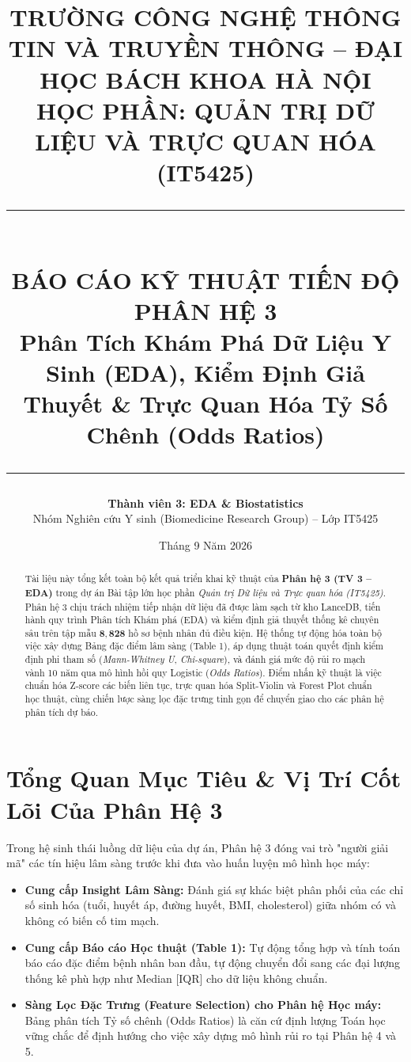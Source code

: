 \documentclass[11pt, a4paper]{article}
\title{%
  \vspace{-1.5cm}
  {\Large\bfseries TRƯỜNG CÔNG NGHỆ THÔNG TIN VÀ TRUYỀN THÔNG -- ĐẠI HỌC BÁCH KHOA HÀ NỘI}\\[0.3cm]
  {\large HỌC PHẦN: QUẢN TRỊ DỮ LIỆU VÀ TRỰC QUAN HÓA (IT5425)}\\[0.6cm]
  \rule{\textwidth}{1.5pt}\\[0.3cm]
  {\LARGE\bfseries BÁO CÁO KỸ THUẬT TIẾN ĐỘ PHÂN HỆ 3}\\[0.2cm]
  {\large\color{biomedblue}\textbf{Phân Tích Khám Phá Dữ Liệu Y Sinh (EDA), Kiểm Định Giả Thuyết \& Trực Quan Hóa Tỷ Số Chênh (Odds Ratios)}}\\[0.2cm]
  \rule{\textwidth}{0.8pt}
}
\author{%
  \textbf{Thành viên 3: EDA \& Biostatistics}\\[0.1cm]
  Nhóm Nghiên cứu Y sinh (Biomedicine Research Group) -- Lớp IT5425
}
\date{Tháng 9 Năm 2026}
\begin{document}
\maketitle
\thispagestyle{fancy}

\begin{abstract}
Tài liệu này tổng kết toàn bộ kết quả triển khai kỹ thuật của \textbf{Phân hệ 3 (TV 3 -- EDA)} trong dự án Bài tập lớn học phần \textit{Quản trị Dữ liệu và Trực quan hóa (IT5425)}. Phân hệ 3 chịu trách nhiệm tiếp nhận dữ liệu đã được làm sạch từ kho LanceDB, tiến hành quy trình Phân tích Khám phá (EDA) và kiểm định giả thuyết thống kê chuyên sâu trên tập mẫu $\mathbf{8{,}828}$ hồ sơ bệnh nhân đủ điều kiện. Hệ thống tự động hóa toàn bộ việc xây dựng Bảng đặc điểm lâm sàng (Table 1), áp dụng thuật toán quyết định kiểm định phi tham số (\textit{Mann-Whitney U}, \textit{Chi-square}), và đánh giá mức độ rủi ro mạch vành 10 năm qua mô hình hồi quy Logistic (\textit{Odds Ratios}). Điểm nhấn kỹ thuật là việc chuẩn hóa Z-score các biến liên tục, trực quan hóa Split-Violin và Forest Plot chuẩn học thuật, cùng chiến lược sàng lọc đặc trưng tinh gọn để chuyển giao cho các phân hệ phân tích dự báo.
\end{abstract}

\vspace{0.3cm}
\tableofcontents
\vspace{0.5cm}

\section{Tổng Quan Mục Tiêu \& Vị Trí Cốt Lõi Của Phân Hệ 3}

Trong hệ sinh thái luồng dữ liệu của dự án, Phân hệ 3 đóng vai trò "người giải mã" các tín hiệu lâm sàng trước khi đưa vào huấn luyện mô hình học máy:
\begin{itemize}
    \item \textbf{Cung cấp Insight Lâm Sàng:} Đánh giá sự khác biệt phân phối của các chỉ số sinh hóa (tuổi, huyết áp, đường huyết, BMI, cholesterol) giữa nhóm có và không có biến cố tim mạch.
    \item \textbf{Cung cấp Báo cáo Học thuật (Table 1):} Tự động tổng hợp và tính toán báo cáo đặc điểm bệnh nhân ban đầu, tự động chuyển đổi sang các đại lượng thống kê phù hợp như Median [IQR] cho dữ liệu không chuẩn.
    \item \textbf{Sàng Lọc Đặc Trưng (Feature Selection) cho Phân hệ Học máy:} Bảng phân tích Tỷ số chênh (Odds Ratios) là căn cứ định lượng Toán học vững chắc để định hướng cho việc xây dựng mô hình rủi ro tại Phân hệ 4 và 5.
\end{itemize}
\end{document}
